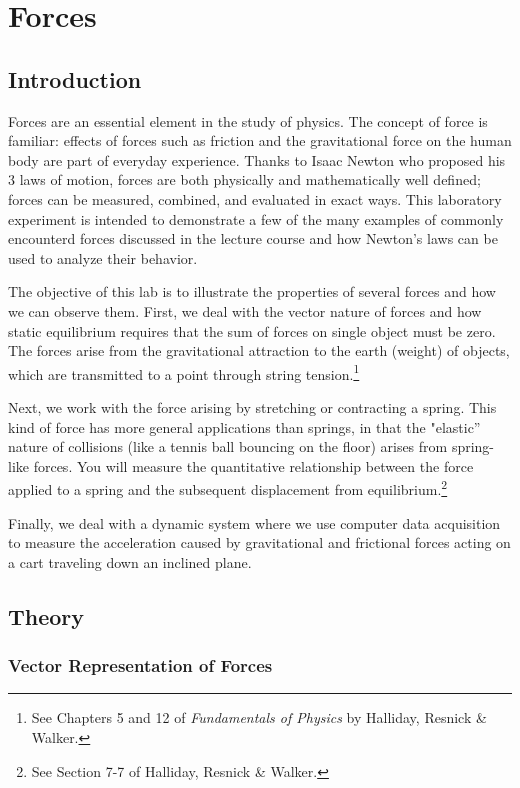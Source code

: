 \chapter{Forces}
\label{chap:forces}
\section{Introduction}

Forces are an essential element in the study of physics. The concept of force is familiar: effects of forces such as friction and the gravitational force on the human body are part of everyday experience. Thanks to Isaac Newton who proposed his 3 laws of motion, forces are both physically and mathematically well defined; forces can be measured, combined, and evaluated in exact ways. This laboratory experiment  is intended to demonstrate a few of the many examples of commonly encounterd forces discussed in the lecture course and how Newton's laws can be used to analyze their behavior. \myskip

The objective of this lab is to  illustrate the properties of several forces and how we can observe them. First, we deal with the vector nature of forces and how static equilibrium requires that the sum of forces on single object must be zero. The forces arise from the gravitational attraction to the earth (weight) of objects, which are transmitted to a point through string tension.\footnote{See Chapters 5 and 12 of \emph{Fundamentals of Physics} by Halliday, Resnick \& Walker.} \myskip

Next, we work with the force arising by stretching or contracting a spring. This kind of force has more general applications than springs, in that the "elastic'' nature of collisions (like a tennis ball bouncing on the floor) arises from spring-like forces. You will measure the quantitative relationship between the force applied to a spring and the subsequent displacement from equilibrium.\footnote{See Section 7-7 of Halliday, Resnick \& Walker.} \myskip

Finally, we deal with a dynamic system where we use computer data acquisition to measure the acceleration caused by gravitational and frictional forces acting on a cart traveling down an inclined plane. \myskip

\section{Theory}

\subsection{Vector Representation of Forces}

